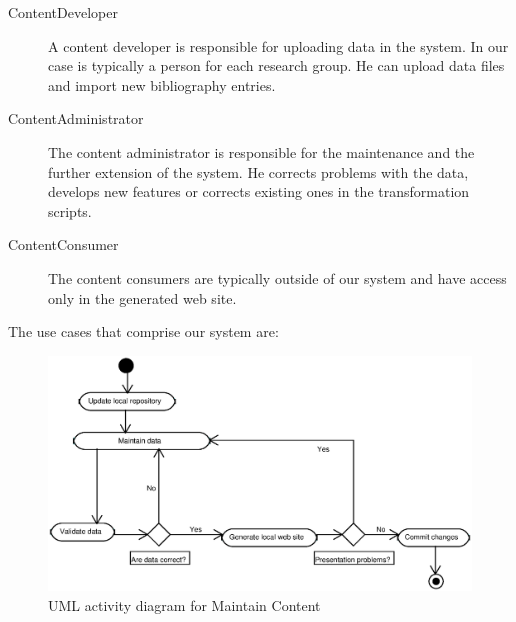 \documentclass[10pt]{article}
\begin{document}
\begin{description}
\item[ContentDeveloper] A content developer is responsible for uploading data in the system. 
In our case is typically a person for each research group. He can upload data files and 
import new bibliography entries.

\item[ContentAdministrator] The content administrator is responsible for the maintenance 
and the further extension of the system. He corrects problems with the data, develops 
new features or corrects existing ones in the transformation scripts.

\item[ContentConsumer] The content consumers are typically outside of our system
and have access only in the generated web site.
\end{description}

The use cases that comprise our system are:

\begin{figure}
\includegraphics[scale=0.6]{maintain-content-activity}
\caption{UML activity diagram for Maintain Content}
\label{fig:maintain-content-diagram}
\end{figure}
\end{document}
